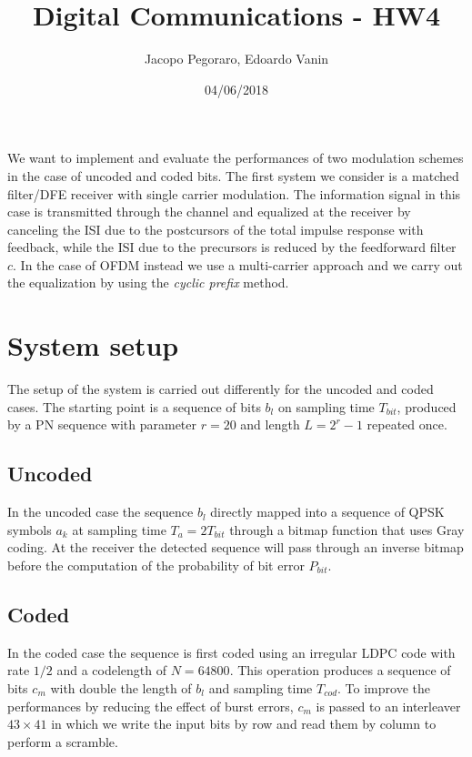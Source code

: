 \documentclass[a4paper,11.5pt]{article}
\title{Digital Communications - HW4}
\author{Jacopo Pegoraro, Edoardo Vanin}
\date{04/06/2018}
\begin{document}
\maketitle

We want to implement and evaluate the performances of two modulation schemes in the case of uncoded and coded bits. The first system we consider is a matched filter/DFE receiver with single carrier modulation. The information signal in this case is transmitted through the channel and equalized at the receiver by canceling the ISI due to the postcursors of the total impulse response with feedback, while the ISI due to the precursors is reduced by the feedforward filter $c$. In the case of OFDM instead we use a multi-carrier approach and we carry out the equalization by using the \emph{cyclic prefix} method. 

\section*{System setup}

The setup of the system is carried out differently for the uncoded and coded cases. The starting point is a sequence of bits $b_l$ on sampling time $T_{bit}$, produced by a PN sequence with parameter $r=20$ and length $L=2^r-1$ repeated once.

\subsection*{Uncoded}

In the uncoded case the sequence $b_l$ directly mapped into a sequence of QPSK symbols $a_k$ at sampling time $T_a=2T_{bit}$ through a bitmap function that uses Gray coding. At the receiver the detected sequence will pass through an inverse bitmap before the computation of the probability of bit error $P_{bit}$.

\subsection*{Coded}

In the coded case the sequence is first coded using an irregular LDPC code with rate $1/2$ and a codelength of $N = 64800$. This operation produces a sequence of bits $c_m$ with double the length of $b_l$ and sampling time $T_{cod}$. To improve the performances by reducing the effect of burst errors, $c_m$ is passed to an interleaver $43 \times 41$ in which we write the input bits by row and read them by column to perform a scramble.
\end{document}
